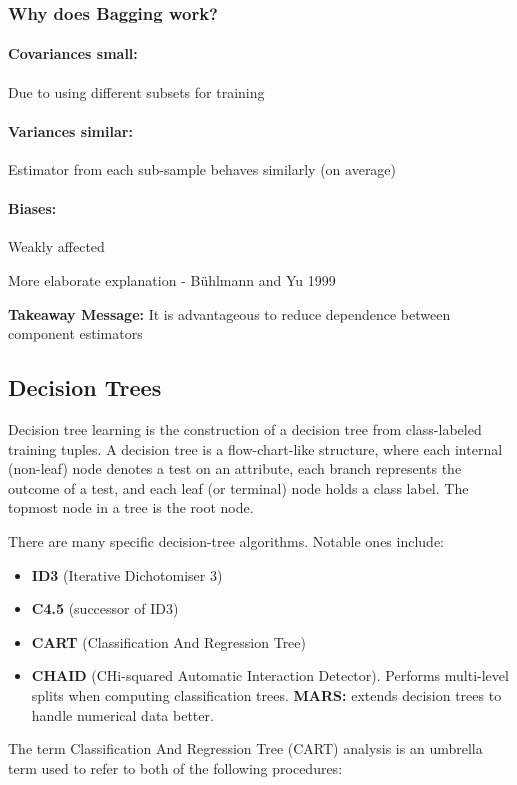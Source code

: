 \documentclass[main]{subfiles}
\begin{document}
\subsubsection{Why does Bagging work?}
\paragraph{Covariances small:} Due to using different subsets for training
\paragraph{Variances similar:} Estimator from each sub-sample behaves similarly (on average)
\paragraph{Biases:} Weakly affected

More elaborate explanation - B\"uhlmann and Yu 1999

\textbf{Takeaway Message:}
It is advantageous to reduce dependence between component estimators
\subsection{Decision Trees}
Decision tree learning is the construction of a decision tree from class-labeled training tuples. A decision tree is a flow-chart-like structure, where each internal (non-leaf) node denotes a test on an attribute, each branch represents the outcome of a test, and each leaf (or terminal) node holds a class label. The topmost node in a tree is the root node.

There are many specific decision-tree algorithms. Notable ones include:

\begin{itemize}
\item \textbf{ID3} (Iterative Dichotomiser 3)
\item \textbf{C4.5} (successor of ID3)
\item \textbf{CART} (Classification And Regression Tree)
\item \textbf{CHAID} (CHi-squared Automatic Interaction Detector). Performs multi-level splits when computing classification trees.
\textbf{MARS:} extends decision trees to handle numerical data better.
\end{itemize}

The term Classification And Regression Tree (CART) analysis is an umbrella term used to refer to both of the following procedures:
\end{document}
